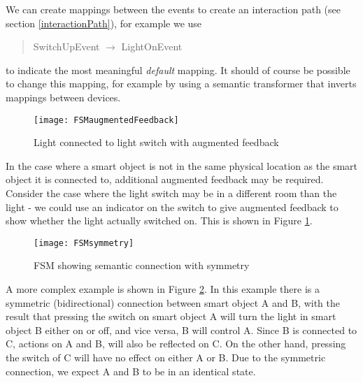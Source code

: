 We can create mappings between the events to create an interaction path (see section \ref{interactionPath}), for example we use

\begin{quote}
SwitchUpEvent $\rightarrow$ LightOnEvent %
\end{quote}

to indicate the most meaningful \emph{default} mapping. It should of course be possible to change this mapping, for example by using a semantic transformer that inverts mappings between devices.

\begin{figure}
\centerline{\texttt{[image: FSMaugmentedFeedback]}}
\caption{Light connected to light switch with augmented feedback}
\label{FSMaugmentedFeedback}
\end{figure}

In the case where a smart object is not in the same physical location as the smart object it is connected to, additional augmented feedback may be required. Consider the case where the light switch may be in a different room than the light - we could use an indicator on the switch to give augmented feedback to show whether the light actually switched on. This is shown in Figure \ref{FSMaugmentedFeedback}.

\begin{figure}
\centerline{\texttt{[image: FSMsymmetry]}}
\caption{FSM showing semantic connection with symmetry}
\label{FSMsymmetry}
\end{figure}

A more complex example is shown in Figure \ref{FSMsymmetry}. In this example there is a symmetric (bidirectional) connection between smart object A and B, with the result that pressing the switch on smart object A will turn the light in smart object B either on or off, and vice versa, B will control A. Since B is connected to C, actions on A and B, will also be reflected on C. On the other hand, pressing the switch of C will have no effect on either A or B. Due to the symmetric connection, we expect A and B to be in an identical state. %

